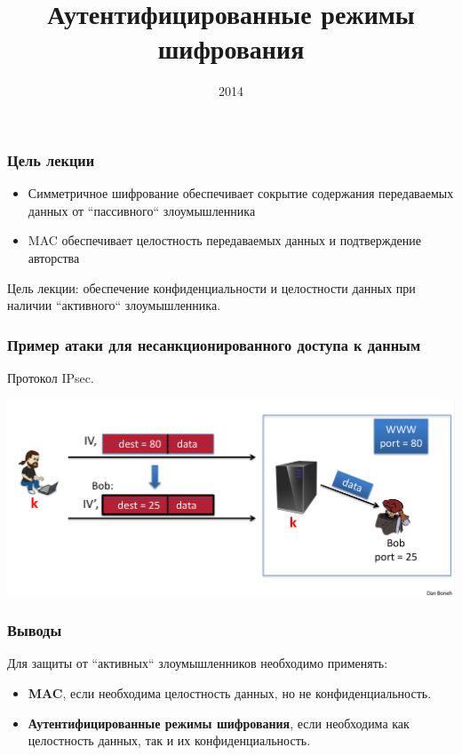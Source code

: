 \documentclass{beamer}
\title{Аутентифицированные режимы шифрования}
\institute{ВГУ}
\date{2014}
\begin{document}
\frame{\titlepage}

\begin{frame}
  \frametitle{Цель лекции}

  \begin{itemize}
    \item{Симметричное шифрование обеспечивает сокрытие содержания передаваемых
      данных от ``пассивного`` злоумышленника}
    \item{MAC обеспечивает целостность передаваемых данных и подтверждение авторства}
  \end{itemize}

  \vspace{8mm}
  Цель лекции: обеспечение конфиденциальности и целостности данных при наличии ``активного`` злоумышленника.
\end{frame}

\begin{frame}
  \frametitle{Пример атаки для несанкционированного доступа к данным}

  Протокол IPsec.

  \includegraphics[width=\linewidth]{./img/png/ipsec_attack.png}

\end{frame}

\begin{frame}
  \frametitle{Выводы}

  Для защиты от ``активных`` злоумышленников необходимо применять:
  \begin{itemize}
    \item{\textbf{MAC}, если необходима целостность данных, но не конфиденциальность.}
    \item{\textbf{Аутентифицированные режимы шифрования}, если необходима как целостность данных,
      так и их конфиденциальность.}
  \end{itemize}
\end{frame}
\end{document}
